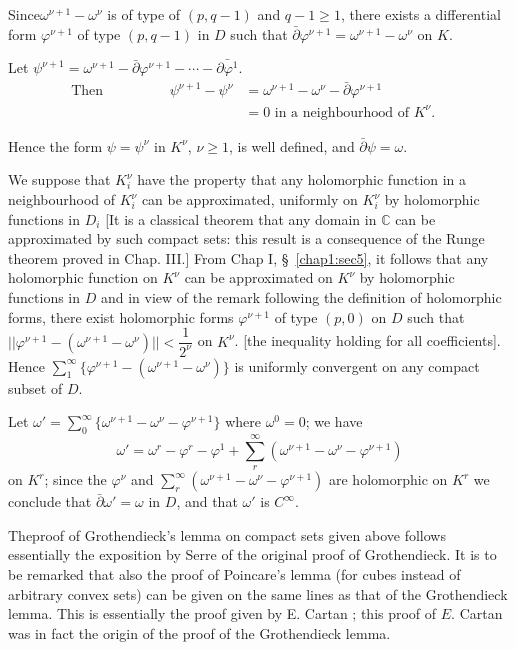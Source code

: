 Since\pageoriginale $\omega^{\nu + 1} - \omega^\nu$ is of type of $(p, q-1)$ and
$q-1 \geq 1$, there exists a differential form $\varphi^{\nu + 1}$ of
type $(p, q - 1)$ in $D$ such that $\bar{\partial} \varphi^{\nu +1} =
\omega^{\nu + 1} - \omega^\nu$ on $K$. 

Let $\psi^{\nu + 1} = \omega^{\nu + 1} - \bar{\partial}\varphi^{\nu
  +1} - \cdots - \bar{\partial \varphi^1}$. 
\begin{align*}
  \text{Then} \hspace{2cm} \psi^{\nu + 1} - \psi^\nu & = \omega^{\nu + 1} -
  \omega^\nu - \bar{\partial} \varphi^{\nu +1}\hspace{2cm}\\ 
  & = 0  \text { in a neighbourhood of } K^\nu.
\end{align*}

Hence the form $\psi = \psi^\nu$ in $K^\nu$, $\nu \geq 1$, is well
defined, and $\bar{\partial} \psi = \omega$. 

We suppose that $K^\nu_i$ have the property that any holomorphic
function in a neighbourhood of $K^\nu_i$ can be approximated,
uniformly on $K^\nu_i$ by holomorphic functions in $D_i$ [It is a
  classical theorem that any domain in $\mathbb{C}$ can be
  approximated by such compact sets: this result is a consequence of
  the Runge theorem proved in Chap. III.] From Chap I, \S\ \ref{chap1:sec5}, it
follows that any holomorphic function on $K^\nu$ can be approximated
on $K^\nu$ by holomorphic functions in $D$ and in view of the remark
following the definition of holomorphic forms, there exist holomorphic
forms $\varphi^{\nu + 1}$ of type $(p,0)$ on $D$ such that
$||\varphi^{\nu + 1} - (\omega^{\nu +1} - \omega^\nu ) || <
\dfrac{1}{2^\nu}$ on $K^\nu$. [the inequality holding for all
  coefficients]. Hence $\sum \limits^\infty_1 \{ \varphi^{\nu + 1} -
(\omega^{\nu + 1} - \omega^\nu )\}$ is uniformly convergent on any
compact subset of $D$. 

Let $\omega' = \sum \limits^\infty_0 \{  \omega^{\nu +1} - \omega^\nu
- \varphi^{\nu + 1} \}$ where $\omega^0 = 0$; we have 
$$
\omega' = \omega^r - \varphi^r - \varphi^1 + \sum \limits^\infty_r  (
\omega^{\nu +1} - \omega^\nu  - \varphi^{\nu + 1}) 
$$
on $K^r$; since the $\varphi^\nu$ and $\sum \limits^\infty_r(
\omega^{\nu +1} - \omega^\nu  - \varphi^{\nu + 1})$ are holomorphic on
$K^r$ we conclude that $\bar{\partial} \omega' = \omega$ in $D$, and
that $\omega'$ is $C^\infty$. 

The\pageoriginale proof of Grothendieck's lemma on compact sets given above follows
essentially the exposition by Serre \cite{41}  of the original proof of
Grothendieck. It is to be remarked that also the proof of Poincare's
lemma (for cubes instead of arbitrary convex sets) can be given on the
same lines as that of the Grothendieck lemma. This is essentially the
proof given by E. Cartan \cite{5}; this proof of $E$. Cartan was in fact
the origin of the proof of the Grothendieck lemma. 

